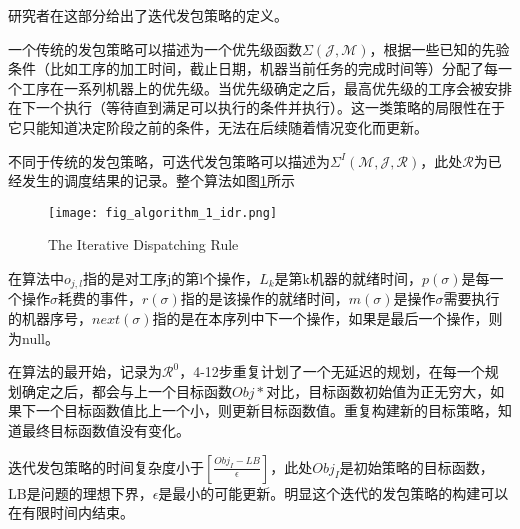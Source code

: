 研究者在这部分给出了迭代发包策略的定义。

一个传统的发包策略可以描述为一个优先级函数$\Sigma(\mathcal{J,M})$，根据一些已知的先验条件（比如工序的加工时间，截止日期，机器当前任务的完成时间等）分配了每一个工序在一系列机器上的优先级。当优先级确定之后，最高优先级的工序会被安排在下一个执行（等待直到满足可以执行的条件并执行）。这一类策略的局限性在于它只能知道决定阶段之前的条件，无法在后续随着情况变化而更新。

不同于传统的发包策略，可迭代发包策略可以描述为$\Sigma^I(\mathcal{M, J, R})$，此处$\mathcal{R}$为已经发生的调度结果的记录。整个算法如图\ref{fig:algorithm_idr}所示

\begin{figure}[H]
    \texttt{[image: fig\_algorithm\_1\_idr.png]}
    \caption{The Iterative Dispatching Rule}
    \label{fig:algorithm_idr}
\end{figure}

在算法中$o_{j,l}$指的是对工序j的第l个操作，$L_k$是第k机器的就绪时间，$p(\sigma)$是每一个操作$\sigma$耗费的事件，$r(\sigma)$指的是该操作的就绪时间，$m(\sigma)$是操作$\sigma$需要执行的机器序号，$next(\sigma)$指的是在本序列中下一个操作，如果是最后一个操作，则为null。

在算法的最开始，记录为$\mathcal{R^0}$，4-12步重复计划了一个无延迟的规划，在每一个规划确定之后，都会与上一个目标函数$Obj*$对比，目标函数初始值为正无穷大，如果下一个目标函数值比上一个小，则更新目标函数值。重复构建新的目标策略，知道最终目标函数值没有变化。

迭代发包策略的时间复杂度小于$\left[\frac{Obj_I-LB}{\epsilon}\right]$，此处$Obj_I$是初始策略的目标函数，LB是问题的理想下界，$\epsilon$是最小的可能更新。明显这个迭代的发包策略的构建可以在有限时间内结束。

